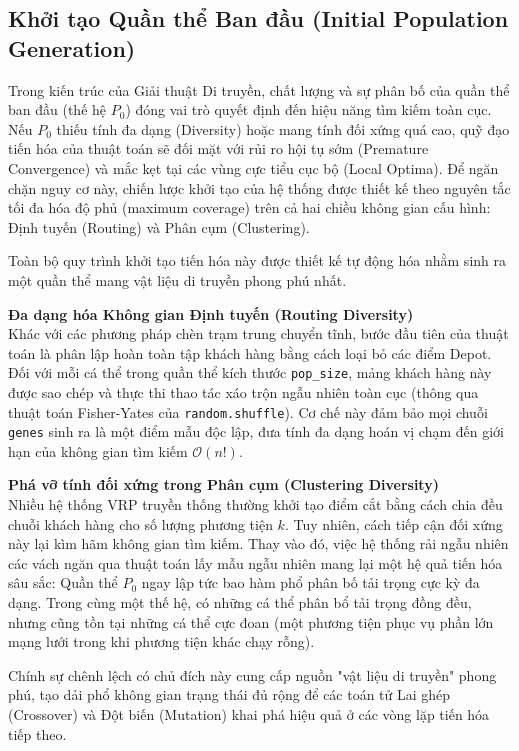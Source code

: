 \documentclass[12pt,a4paper]{article}
\numberwithin{figure}{subsection}
\begin{document}
\subsection{Khởi tạo Quần thể Ban đầu (Initial Population Generation)}

Trong kiến trúc của Giải thuật Di truyền, chất lượng và sự phân bố của quần thể ban đầu (thế hệ $P_0$) đóng vai trò quyết định đến hiệu năng tìm kiếm toàn cục. Nếu $P_0$ thiếu tính đa dạng (Diversity) hoặc mang tính đối xứng quá cao, quỹ đạo tiến hóa của thuật toán sẽ đối mặt với rủi ro hội tụ sớm (Premature Convergence) và mắc kẹt tại các vùng cực tiểu cục bộ (Local Optima). Để ngăn chặn nguy cơ này, chiến lược khởi tạo của hệ thống được thiết kế theo nguyên tắc tối đa hóa độ phủ (maximum coverage) trên cả hai chiều không gian cấu hình: Định tuyến (Routing) và Phân cụm (Clustering).

Toàn bộ quy trình khởi tạo tiến hóa này được thiết kế tự động hóa nhằm sinh ra một quần thể mang vật liệu di truyền phong phú nhất.

\noindent\textbf{Đa dạng hóa Không gian Định tuyến (Routing Diversity)} \\
Khác với các phương pháp chèn trạm trung chuyển tĩnh, bước đầu tiên của thuật toán là phân lập hoàn toàn tập khách hàng bằng cách loại bỏ các điểm Depot. Đối với mỗi cá thể trong quần thể kích thước \texttt{pop\_size}, mảng khách hàng này được sao chép và thực thi thao tác xáo trộn ngẫu nhiên toàn cục (thông qua thuật toán Fisher-Yates của \texttt{random.shuffle}). Cơ chế này đảm bảo mọi chuỗi \texttt{genes} sinh ra là một điểm mẫu độc lập, đưa tính đa dạng hoán vị chạm đến giới hạn của không gian tìm kiếm $\mathcal{O}(n!)$.

\noindent\textbf{Phá vỡ tính đối xứng trong Phân cụm (Clustering Diversity)} \\
Nhiều hệ thống VRP truyền thống thường khởi tạo điểm cắt bằng cách chia đều chuỗi khách hàng cho số lượng phương tiện $k$. Tuy nhiên, cách tiếp cận đối xứng này lại kìm hãm không gian tìm kiếm. Thay vào đó, việc hệ thống rải ngẫu nhiên các vách ngăn qua thuật toán lấy mẫu ngẫu nhiên mang lại một hệ quả tiến hóa sâu sắc: Quần thể $P_0$ ngay lập tức bao hàm phổ phân bố tải trọng cực kỳ đa dạng. Trong cùng một thế hệ, có những cá thể phân bổ tải trọng đồng đều, nhưng cũng tồn tại những cá thể cực đoan (một phương tiện phục vụ phần lớn mạng lưới trong khi phương tiện khác chạy rỗng).

Chính sự chênh lệch có chủ đích này cung cấp nguồn "vật liệu di truyền" phong phú, tạo dải phổ không gian trạng thái đủ rộng để các toán tử Lai ghép (Crossover) và Đột biến (Mutation) khai phá hiệu quả ở các vòng lặp tiến hóa tiếp theo.
\end{document}
